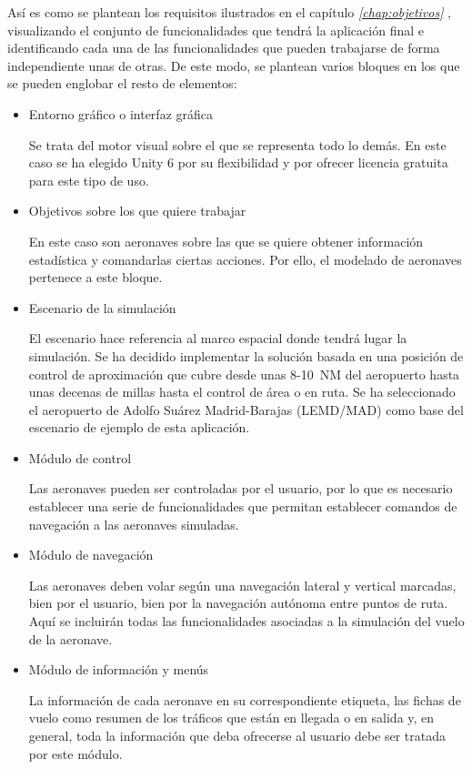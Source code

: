 Así es como se plantean los requisitos ilustrados en el capítulo \textit{\ref{chap:objetivos} }, visualizando el conjunto de funcionalidades que tendrá la aplicación final e identificando cada una de las funcionalidades que pueden trabajarse de forma independiente unas de otras. De este modo, se plantean varios bloques en los que se pueden englobar el resto de elementos:


\begin{itemize}
\item Entorno gráfico o interfaz gráfica

Se trata del motor visual sobre el que se representa todo lo demás. En este caso se ha elegido Unity 6 por su flexibilidad y por ofrecer licencia gratuita para este tipo de uso.


\item Objetivos sobre los que quiere trabajar

En este caso son aeronaves sobre las que se quiere obtener información estadística y comandarlas ciertas acciones. Por ello, el modelado de aeronaves pertenece a este bloque.


\item Escenario de la simulación

El escenario hace referencia al marco espacial donde tendrá lugar la simulación. Se ha decidido implementar la solución basada en una posición de control de aproximación que cubre desde unas \SI{8}{}-\SI{10}{NM} del aeropuerto hasta unas decenas de millas hasta el control de área o en ruta. Se ha seleccionado el aeropuerto de Adolfo Suárez Madrid-Barajas (LEMD/MAD) como base del escenario de ejemplo de esta aplicación.


\item Módulo de control

Las aeronaves pueden ser controladas por el usuario, por lo que es necesario establecer una serie de funcionalidades que permitan establecer comandos de navegación a las aeronaves simuladas.


\item Módulo de navegación

Las aeronaves deben volar según una navegación lateral y vertical marcadas, bien por el usuario, bien por la navegación autónoma entre puntos de ruta. Aquí se incluirán todas las funcionalidades asociadas a la simulación del vuelo de la aeronave.

\item Módulo de información y menús

La información de cada aeronave en su correspondiente etiqueta, las fichas de vuelo como resumen de los tráficos que están en llegada o en salida y, en general, toda la información que deba ofrecerse al usuario debe ser tratada por este módulo. 

\end{itemize}



